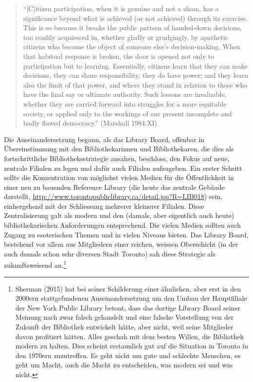 \documentclass[a4paper,
fontsize=11pt,
oneside,
numbers=noperiodatend,
parskip=half-,
bibliography=totoc,
final
]{scrartcl}
\begin{document}
\begin{quote}
\enquote{{[}C{]}itizen participation, when it is genuine and not a sham,
has a significance beyond what is achieved (or not achieved) through its
exercise. This is so because it breaks the public pattern of handed-down
decisions, too readily acquiesced in, whether gladly or grudgingly, by
apathetic citizens who become the object of someone else's
decision-making. When that habitual response is broken, the door is
opened not only to participation but to learning. Essentially, citizens
learn that they can make decisions, they can share responsibility, they
do have power; and they learn also the limit of that power, and where
they stand in relation to those who have the final say or ultimate
authority. Such lessons are invaluable, whether they are carried forward
into struggles for a more equitable society, or applied only to the
workings of our present incomplete and badly flawed democracy.}
(Marshall 1984:XI)
\end{quote}

Die Auseinandersetzung begann, als das Library Board, offenbar in
Übereinstimmung mit den Bibliothekarinnen und Bibliothekaren, die dies
als fortschrittliche Bibliotheksstrategie ansahen, beschloss, den Fokus
auf neue, zentrale Filialen zu legen und dafür auch Filialen aufzugeben.
Ein erster Schritt sollte die Konzentration von möglichst vielen Medien
für die Öffentlichkeit in einer neu zu bauenden Reference Library (die
heute das zentrale Gebäude darstellt,
\url{http://www.torontopubliclibrary.ca/detail.jsp?R=LIB018}) sein,
einhergehend mit der Schliessung mehrerer kleinerer Filialen. Diese
Zentralisierung galt als modern und den (damals, aber eigentlich auch
heute) bibliothekarischen Anforderungen entsprechend. Die vielen Medien
sollten auch Zugang zu esoterischen Themen und in vielen Niveaus bieten.
Das Library Board, bestehend vor allem aus Mitgliedern einer reichen,
weissen Oberschicht (in der auch damals schon sehr diversen Stadt
Toronto) sah diese Strategie als zukunftsweisend an.\footnote{Sherman
  (2015) hat bei seiner Schilderung einer ähnlichen, aber erst in den
  2000ern stattgefundenen Auseinandersetzung um den Umbau der
  Hauptfiliale der New York Public Library betont, dass das dortige
  Library Board seiner Meinung nach zwar falsch gehandelt und eine
  falsche Vorstellung von der Zukunft der Bibliothek entwickelt hätte,
  aber nicht, weil seine Mitglieder davon profitiert hätten. Alles
  geschah mit dem besten Willen, die Bibliothek modern zu halten. Dies
  scheint erstaunlich gut auf die Situation in Toronto in den 1970ern
  zuzutreffen. Es geht nicht um gute und schlechte Menschen, es geht um
  Macht, auch die Macht zu entscheiden, was modern sei und was nicht.}
\end{document}
